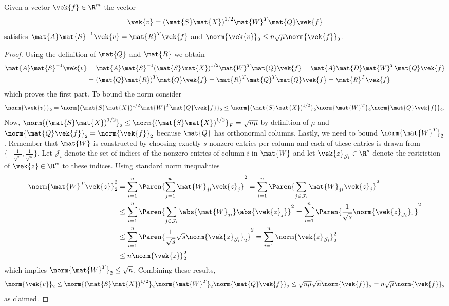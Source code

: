 \begin{theorem}
Given a vector \(\vek{f} \in \R^m\) the vector
\[ \vek{v} = {(\mat{S}\mat{X})}^{1/2} \mat{W}^T \mat{Q} \vek{f} \]
satisfies \( \mat{A}\mat{S}^{-1}\vek{v} = \mat{R}^T \vek{f} \) and \(\norm{\vek{v}}_2 \leq n \sqrt{\mu} \norm{\vek{f}}_2\).
\end{theorem}
\begin{proof}
Using the definition of \(\mat{Q}\) and \(\mat{R}\) we obtain
\begin{align*}
  \mat{A} \mat{S}^{-1} \vek{v}
  &= \mat{A} \mat{S}^{-1} {(\mat{S}\mat{X})}^{1/2} \mat{W}^T \mat{Q} \vek{f}
   = \mat{A} \mat{D} \mat{W}^T \mat{Q} \vek{f} \\
  &= {(\mat{Q} \mat{R})}^T \mat{Q} \vek{f}
   = \mat{R}^T \mat{Q}^T \mat{Q} \vek{f}
   = \mat{R}^T \vek{f}
\end{align*}
which proves the first part.
To bound the norm consider
\[ 
  \norm{\vek{v}}_2
  = \norm{{(\mat{S}\mat{X})}^{1/2} \mat{W}^T \mat{Q} \vek{f}}_2
  \leq \norm{{(\mat{S}\mat{X})}^{1/2}}_2 \norm{\mat{W}^T}_2 \norm{\mat{Q} \vek{f}}_2.
\]
Now, \(\norm{{(\mat{S}\mat{X})}^{1/2}}_2 \leq \norm{{(\mat{S}\mat{X})}^{1/2}}_F = \sqrt{n \mu}\) by definition of \(\mu\) and \(\norm{\mat{Q}\vek{f}}_2 = \norm{\vek{f}}_2\) because \(\mat{Q}\) has orthonormal columns.
Lastly, we need to bound \(\norm{\mat{W}^T}_2\).
Remember that \(\mat{W}\) is constructed by choosing exactly \(s\) nonzero entries per column and each of these entries is drawn from \(\{-\frac{1}{\sqrt{s}}, \frac{1}{\sqrt{s}}\}\).
Let \(\mathcal{J}_i\) denote the set of indices of the nonzero entries of column \(i\) in \(\mat{W}\) and let \(\vek{z}_{\mathcal{J}_i} \in \R^s\) denote the restriction of \(\vek{z} \in \R^w\) to these indices.
Using standard norm inequalities
\begin{align*}
  \norm{\mat{W}^T \vek{z}}_2^2 &= \sum_{i=1}^{n} \Paren{ \sum_{j=1}^{w} \mat{W}_{ji} \vek{z}_j }^2 = \sum_{i=1}^{n} \Paren{ \sum_{j \in \mathcal{J}_i} \mat{W}_{ji} \vek{z}_j }^2 \\
  &\leq \sum_{i=1}^{n} \Paren{ \sum_{j \in \mathcal{J}_i} \abs{\mat{W}_{ji}} \abs{\vek{z}_j} }^2 = \sum_{i=1}^{n} \Paren{ \frac{1}{\sqrt{s}} \norm{\vek{z}_{\mathcal{J}_i}}_1 }^2 \\
  &\leq \sum_{i=1}^{n} \Paren{ \frac{1}{\sqrt{s}} \sqrt{s} \norm{\vek{z}_{\mathcal{J}_i}}_2 }^2 = \sum_{i=1}^{n} \norm{\vek{z}_{\mathcal{J}_i}}_2^2 \\
  &\leq n \norm{\vek{z}}_2^2
\end{align*}
which implies \(\norm{\mat{W}^T}_2 \leq \sqrt{n}\).
Combining these results,
\[ 
  \norm{\vek{v}}_2
  \leq \norm{{(\mat{S}\mat{X})}^{1/2}}_2 \norm{\mat{W}^T}_2 \norm{\mat{Q} \vek{f}}_2
  \leq \sqrt{n \mu} \sqrt{n} \norm{\vek{f}}_2 = n \sqrt{\mu} \norm{\vek{f}}_2
\]
as claimed.
\end{proof}
